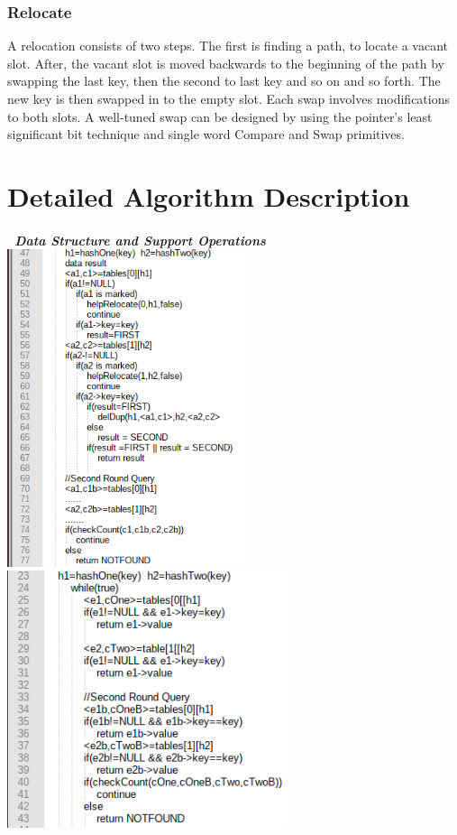 \documentclass{article}
\begin{document}
\bigskip

\subsubsection{Relocate}
A relocation consists of two steps. The first is finding a path, to locate a vacant slot. After, the vacant slot is
moved backwards to the beginning of the path by swapping the last key, then the second to last key and so on and so
forth. The new key is then swapped in to the empty slot. Each swap involves modifications to both slots. A well-tuned
swap can be designed by using the pointer's least significant bit technique and single word Compare and Swap
primitives.

\section{Detailed Algorithm Description}
\subparagraph[\ Data Structure and Support Operations]{\ Data Structure and Support Operations
\includegraphics[width=2.7638in,height=3.661in]{Report-img001.png} 
\includegraphics[width=3.2299in,height=2.9598in]{Report-img002.png} }
\end{document}

